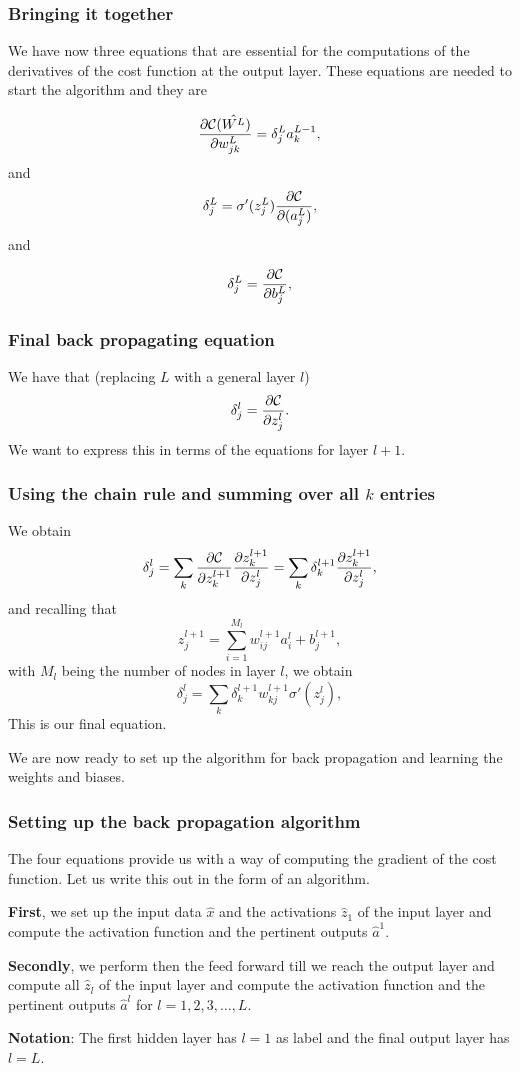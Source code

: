 \documentclass{beamer}
\begin{document}
\begin{frame}
\frametitle{Bringing it together}

We have now three equations that are essential for the computations of the derivatives of the cost function at the output layer. These equations are needed to start the algorithm and they are

\begin{equation}
\frac{\partial{\cal C}(\hat{W^L})}{\partial w_{jk}^L}  =  \delta_j^La_k^{L-1},
\end{equation}
and
\begin{equation}
\delta_j^L = \sigma'(z_j^L)\frac{\partial {\cal C}}{\partial (a_j^L)},
\end{equation}
and

\begin{equation}
\delta_j^L = \frac{\partial {\cal C}}{\partial b_j^L},
\end{equation}
\end{frame}

\begin{frame}
\frametitle{Final back propagating equation}

We have that (replacing $L$ with a general layer $l$)
\[
\delta_j^l =\frac{\partial {\cal C}}{\partial z_j^l}.
\]
We want to express this in terms of the equations for layer $l+1$.
\end{frame}

\begin{frame}
\frametitle{Using the chain rule and summing over all $k$ entries}

We obtain
\[
\delta_j^l =\sum_k \frac{\partial {\cal C}}{\partial z_k^{l+1}}\frac{\partial z_k^{l+1}}{\partial z_j^{l}}=\sum_k \delta_k^{l+1}\frac{\partial z_k^{l+1}}{\partial z_j^{l}},
\]
and recalling that
\[
z_j^{l+1} = \sum_{i=1}^{M_{l}}w_{ij}^{l+1}a_i^{l}+b_j^{l+1},
\]
with $M_l$ being the number of nodes in layer $l$, we obtain
\[
\delta_j^l =\sum_k \delta_k^{l+1}w_{kj}^{l+1}\sigma'(z_j^l),
\]
This is our final equation.

We are now ready to set up the algorithm for back propagation and learning the weights and biases.
\end{frame}

\begin{frame}
\frametitle{Setting up the back propagation algorithm}

The four equations  provide us with a way of computing the gradient of the cost function. Let us write this out in the form of an algorithm.

\textbf{First}, we set up the input data $\hat{x}$ and the activations
$\hat{z}_1$ of the input layer and compute the activation function and
the pertinent outputs $\hat{a}^1$.

\textbf{Secondly}, we perform then the feed forward till we reach the output
layer and compute all $\hat{z}_l$ of the input layer and compute the
activation function and the pertinent outputs $\hat{a}^l$ for
$l=1,2,3,\dots,L$.

\textbf{Notation}: The first hidden layer has $l=1$ as label and the final output layer has $l=L$.
\end{frame}
\end{document}
